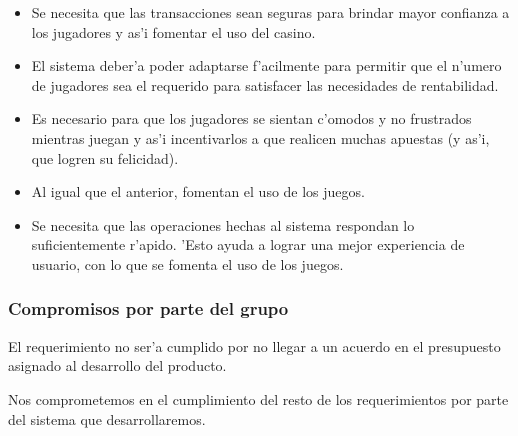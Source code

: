 \begin{itemize}

\item {} 

 Se necesita que las transacciones sean seguras para brindar mayor confianza a los jugadores y as'i fomentar el uso del casino.

\item {} 

 El sistema deber'a poder adaptarse f'acilmente para permitir que el n'umero de jugadores sea el requerido para satisfacer las necesidades de rentabilidad.

\item {} 

 Es necesario para que los jugadores se sientan c'omodos y no frustrados mientras juegan y as'i incentivarlos a que realicen muchas apuestas (y as'i, que logren su felicidad).

\item {} 

 Al igual que el anterior, fomentan el uso de los juegos.

\item {} 

 Se necesita que las operaciones hechas al sistema respondan lo suficientemente r'apido. 'Esto ayuda a lograr una mejor experiencia de usuario, con lo que se fomenta el uso de los juegos.

\end{itemize}


\subsubsection{Compromisos por parte del grupo}

El requerimiento  no ser'a cumplido por no llegar a un acuerdo en el presupuesto asignado al desarrollo del producto.

Nos comprometemos en el cumplimiento del resto de los requerimientos por parte del sistema que desarrollaremos.
